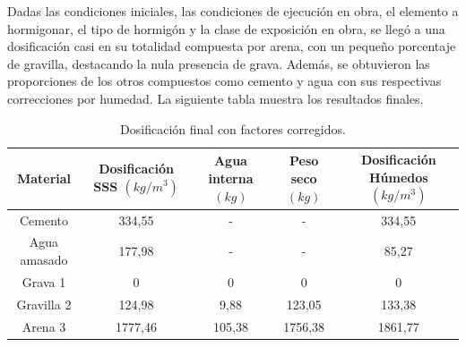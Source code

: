 Dadas las condiciones iniciales, las condiciones de ejecución en obra, el elemento a hormigonar, el tipo de hormigón y la clase de exposición en obra, se llegó a una dosificación casi en su totalidad compuesta por arena, con un pequeño porcentaje de gravilla, destacando la nula presencia de grava. Además, se obtuvieron las proporciones de los otros compuestos como cemento y agua con sus respectivas correcciones por humedad. La siguiente tabla muestra los resultados finales.

\begin{table}[H]
\centering
\caption{Dosificación final con factores corregidos.}
\begin{tabular}{|c|c|c|c|c|} %
\hline
\textbf{Material} & \textbf{Dosificación SSS $(kg/m^3)$} & \textbf{Agua interna $(kg)$} & \textbf{Peso seco $(kg)$} & \textbf{Dosificación Húmedos $(kg/m^3)$} \\ \hline
Cemento & 334,55 & - & - & 334,55 \\ \hline
Agua amasado & 177,98 & - & - & 85,27 \\ \hline
Grava 1 & 0 & 0 & 0 & 0 \\ \hline
Gravilla 2 & 124,98 & 9,88 & 123,05 & 133,38 \\ \hline
Arena 3 & 1777,46 & 105,38 & 1756,38 & 1861,77 \\ \hline
\end{tabular}
\label{tab:ejemplo}
\end{table}

